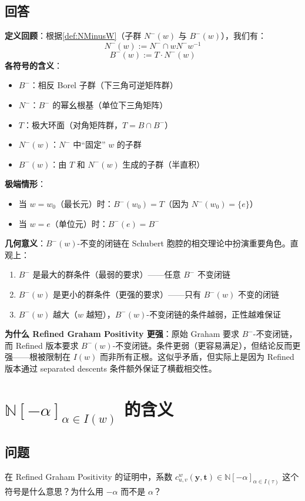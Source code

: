 \subsection{回答}
\textbf{定义回顾}：根据\cref{def:NMinusW}（子群 $N^-(w)$ 与 $B^-(w)$），我们有：$$N^-(w) := N^- \cap w N^- w^{-1}$$$$B^-(w) := T \cdot N^-(w)$$\textbf{各符号的含义}：
\begin{itemize}
\item $B^-$：相反 Borel 子群（下三角可逆矩阵群）
\item $N^-$：$B^-$ 的幂幺根基（单位下三角矩阵）
\item $T$：极大环面（对角矩阵群，$T = B \cap B^-$）
\item $N^-(w)$：$N^-$ 中``固定'' $w$ 的子群
\item $B^-(w)$：由 $T$ 和 $N^-(w)$ 生成的子群（半直积）
\end{itemize}

\textbf{极端情形}：
\begin{itemize}
\item 当 $w = w_0$（最长元）时：$B^-(w_0) = T$（因为 $N^-(w_0) = \{e\}$）
\item 当 $w = e$（单位元）时：$B^-(e) = B^-$
\end{itemize}

\textbf{几何意义}：$B^-(w)$-不变的闭链在 Schubert 胞腔的相交理论中扮演重要角色。直观上：
\begin{enumerate}
\item $B^-$ 是最大的群条件（最弱的要求）——任意 $B^-$ 不变闭链
\item $B^-(w)$ 是更小的群条件（更强的要求）——只有 $B^-(w)$ 不变的闭链
\item $B^-(w)$ 越大（$w$ 越短），$B^-(w)$-不变闭链的条件越弱，正性越难保证
\end{enumerate}

\textbf{为什么 Refined Graham Positivity 更强}：原始 Graham 要求 $B^-$-不变闭链，而 Refined 版本要求 $B^-(w)$-不变闭链。条件更弱（更容易满足），但结论反而更强——根被限制在 $I(w)$ 而非所有正根。这似乎矛盾，但实际上是因为 Refined 版本通过 separated descents 条件额外保证了横截相交性。
\section{$\mathbb{N}[-\alpha]_{\alpha \in I(w)}$ 的含义}\label{sec:NMinusAlphaInIw}
\subsection{问题}
在 Refined Graham Positivity 的证明中，系数 $c^w_{u,v}(\mathbf{y}, \mathbf{t}) \in \mathbb{N}[-\alpha]_{\alpha \in I(\tau)}$ 这个符号是什么意思？为什么用 $-\alpha$ 而不是 $\alpha$？
